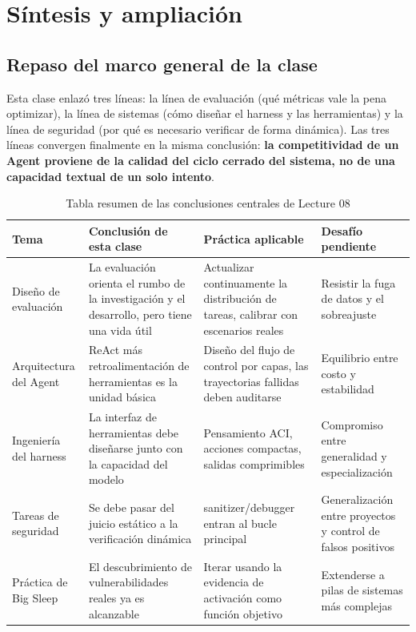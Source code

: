 \section{Síntesis y ampliación}

\subsection{Repaso del marco general de la clase}
Esta clase enlazó tres líneas: la línea de evaluación (qué métricas vale la pena optimizar), la línea de sistemas (cómo diseñar el harness y las herramientas) y la línea de seguridad (por qué es necesario verificar de forma dinámica). Las tres líneas convergen finalmente en la misma conclusión: \textbf{la competitividad de un Agent proviene de la calidad del ciclo cerrado del sistema, no de una capacidad textual de un solo intento}.

\begin{table}[H]
\centering
\begin{tabular}{p{3.1cm}p{4.4cm}p{4.2cm}p{2.6cm}}
\toprule
\textbf{Tema} & \textbf{Conclusión de esta clase} & \textbf{Práctica aplicable} & \textbf{Desafío pendiente} \\
\midrule
Diseño de evaluación & La evaluación orienta el rumbo de la investigación y el desarrollo, pero tiene una vida útil & Actualizar continuamente la distribución de tareas, calibrar con escenarios reales & Resistir la fuga de datos y el sobreajuste \\
Arquitectura del Agent & ReAct más retroalimentación de herramientas es la unidad básica & Diseño del flujo de control por capas, las trayectorias fallidas deben auditarse & Equilibrio entre costo y estabilidad \\
Ingeniería del harness & La interfaz de herramientas debe diseñarse junto con la capacidad del modelo & Pensamiento ACI, acciones compactas, salidas comprimibles & Compromiso entre generalidad y especialización \\
Tareas de seguridad & Se debe pasar del juicio estático a la verificación dinámica & sanitizer/debugger entran al bucle principal & Generalización entre proyectos y control de falsos positivos \\
Práctica de Big Sleep & El descubrimiento de vulnerabilidades reales ya es alcanzable & Iterar usando la evidencia de activación como función objetivo & Extenderse a pilas de sistemas más complejas \\
\bottomrule
\end{tabular}
\caption{Tabla resumen de las conclusiones centrales de Lecture 08}
\end{table}

